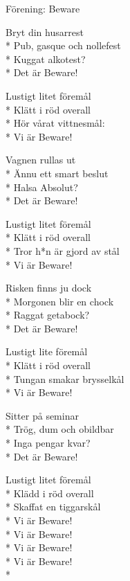 \begin{SongText}[Vi är Beware!]
    \begin{SongInfo}
        Förening: Beware
    \end{SongInfo}
    \begin{Verse}
        Bryt din husarrest\\*%
        Pub, gasque och nollefest\\*%
        Kuggat alkotest?\\*%
        Det är Beware!
    \end{Verse}
    \begin{Verse}
        Lustigt litet föremål\\*%
        Klätt i röd overall\\*%
        Hör vårat vittnesmål:\\*%
        Vi är Beware!
    \end{Verse}
    \begin{Verse}
        Vagnen rullas ut\\*%
        Ännu ett smart beslut\\*%
        Halsa Absolut?\\*%
        Det är Beware!
    \end{Verse}
    \begin{Verse}
        Lustigt litet föremål\\*%
        Klätt i röd overall\\*%
        Tror h*n är gjord av stål\\*%
        Vi är Beware!
    \end{Verse}
    \begin{Verse}
        Risken finns ju dock\\*%
        Morgonen blir en chock\\*%
        Raggat getabock?\\*%
        Det är Beware!
    \end{Verse}
    \begin{Verse}
        Lustigt lite föremål\\*%
        Klätt i röd overall\\*%
        Tungan smakar brysselkål\\*%
        Vi är Beware!
    \end{Verse}
    \begin{Verse}
        Sitter på seminar\\*%
        Trög, dum och obildbar\\*%
        Inga pengar kvar?\\*%
        Det är Beware!
    \end{Verse}
    \begin{Verse}
        Lustigt litet föremål\\*%
        Klädd i röd overall\\*%
        Skaffat en tiggarskål\\*%
        Vi är Beware!\\*%
        Vi är Beware!\\*%
        Vi är Beware!\\*%
        Vi är Beware!\\*%
    \end{Verse}
\end{SongText}

